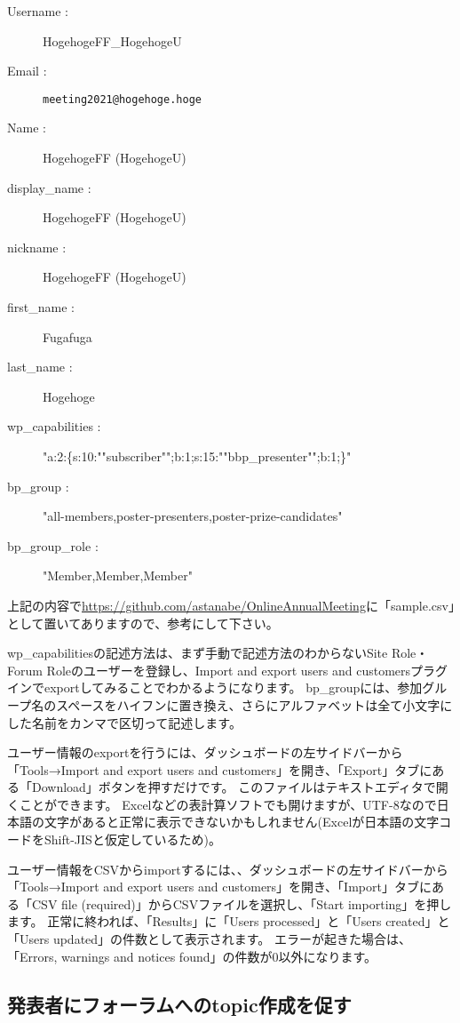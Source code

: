\documentclass[titlepage,10pt,a4paper,uplatex]{jsbook}
\begin{document}
\begin{description}
\item[Username : ] HogehogeFF\_HogehogeU
\item[Email : ] \texttt{meeting2021@hogehoge.hoge}
\item[Name : ] HogehogeFF (HogehogeU)
\item[display\_name : ] HogehogeFF (HogehogeU)
\item[nickname : ] HogehogeFF (HogehogeU)
\item[first\_name : ] Fugafuga
\item[last\_name : ] Hogehoge
\item[wp\_capabilities : ] "a:2:\{s:10:""subscriber"";b:1;s:15:""bbp\_presenter"";b:1;\}"
\item[bp\_group : ] "all-members,poster-presenters,poster-prize-candidates"
\item[bp\_group\_role : ] "Member,Member,Member"
\end{description}

上記の内容で\url{https://github.com/astanabe/OnlineAnnualMeeting}に「sample.csv」として置いてありますので、参考にして下さい。

wp\_capabilitiesの記述方法は、まず手動で記述方法のわからないSite Role・Forum Roleのユーザーを登録し、Import and export users and customersプラグインでexportしてみることでわかるようになります。
bp\_groupには、参加グループ名のスペースをハイフンに置き換え、さらにアルファベットは全て小文字にした名前をカンマで区切って記述します。

ユーザー情報のexportを行うには、ダッシュボードの左サイドバーから「Tools→Import and export users and customers」を開き、「Export」タブにある「Download」ボタンを押すだけです。
このファイルはテキストエディタで開くことができます。
Excelなどの表計算ソフトでも開けますが、UTF-8なので日本語の文字があると正常に表示できないかもしれません(Excelが日本語の文字コードをShift-JISと仮定しているため)。

ユーザー情報をCSVからimportするには、、ダッシュボードの左サイドバーから「Tools→Import and export users and customers」を開き、「Import」タブにある「CSV file (required)」からCSVファイルを選択し、「Start importing」を押します。
正常に終われば、「Results」に「Users processed」と「Users created」と「Users updated」の件数として表示されます。
エラーが起きた場合は、「Errors, warnings and notices found」の件数が0以外になります。

\subsection{発表者にフォーラムへのtopic作成を促す}
\end{document}
